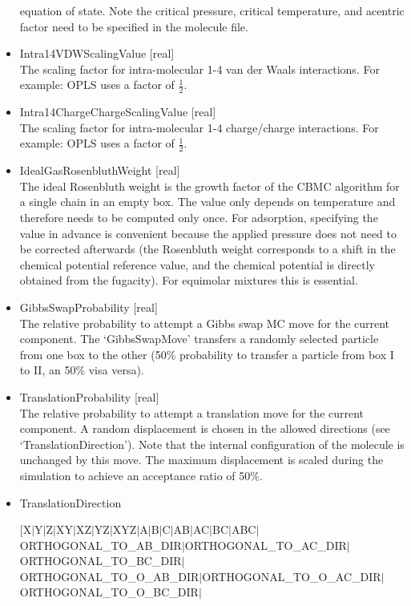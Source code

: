 \begin{itemize}
equation of state. Note the critical pressure, critical temperature, and acentric factor need to be specified in the molecule file.
\item{Intra14VDWScalingValue [real]}\\
The scaling factor for intra-molecular 1-4 van der Waals interactions. For example: OPLS uses a factor of $\frac{1}{2}$.
\item{Intra14ChargeChargeScalingValue [real]}\\
The scaling factor for intra-molecular 1-4 charge/charge interactions. For example: OPLS uses a factor of $\frac{1}{2}$.
\item{IdealGasRosenbluthWeight [real]}\\
The ideal Rosenbluth weight is the growth factor of the CBMC algorithm for a single chain in an empty box. The value only depends on temperature and therefore needs to be computed
only once. For adsorption, specifying the value in advance is convenient because the applied pressure does not need to be corrected afterwards (the Rosenbluth weight corresponds to a shift
in the chemical potential reference value, and the chemical potential is directly obtained from the fugacity). For equimolar mixtures this is essential.
\item{GibbsSwapProbability [real]}\\
The relative probability to attempt a Gibbs swap MC move for the current component. The `GibbsSwapMove' transfers a randomly selected particle from one box to the other
(50\% probability to transfer a particle from box I to II, an 50\% visa versa).
\item{TranslationProbability [real]}\\
The relative probability to attempt a translation move for the current component. A random displacement is chosen in the allowed directions (see `TranslationDirection').
Note that the internal configuration of the molecule is unchanged by this move. The maximum displacement is scaled during the simulation to achieve an acceptance
ratio of 50\%.
\item{TranslationDirection 
      \begin{small}
       [X$|$Y$|$Z$|$XY$|$XZ$|$YZ$|$XYZ$|$A$|$B$|$C$|$AB$|$AC$|$BC$|$ABC$|$\\
      \hspace*{2cm}ORTHOGONAL\_TO\_AB\_DIR$|$ORTHOGONAL\_TO\_AC\_DIR$|$ORTHOGONAL\_TO\_BC\_DIR$|$\\
      \hspace*{2cm}ORTHOGONAL\_TO\_O\_AB\_DIR$|$ORTHOGONAL\_TO\_O\_AC\_DIR$|$ORTHOGONAL\_TO\_O\_BC\_DIR$|$\\

\end{small}}
\end{itemize}
